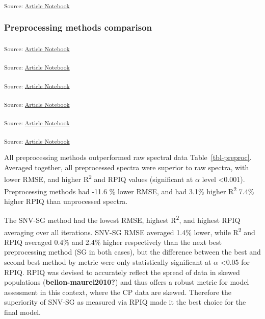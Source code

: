 \documentclass[
]{agujournal2019}
\begin{document}
\textsubscript{Source:
\href{https://rvcrawford.github.io/glowing-system/index.qmd.html}{Article
Notebook}}

\subsubsection{Preprocessing methods
comparison}\label{preprocessing-methods-comparison}

\textsubscript{Source:
\href{https://rvcrawford.github.io/glowing-system/index.qmd.html}{Article
Notebook}}

\textsubscript{Source:
\href{https://rvcrawford.github.io/glowing-system/index.qmd.html}{Article
Notebook}}

\textsubscript{Source:
\href{https://rvcrawford.github.io/glowing-system/index.qmd.html}{Article
Notebook}}

\textsubscript{Source:
\href{https://rvcrawford.github.io/glowing-system/index.qmd.html}{Article
Notebook}}

\textsubscript{Source:
\href{https://rvcrawford.github.io/glowing-system/index.qmd.html}{Article
Notebook}}

\textsubscript{Source:
\href{https://rvcrawford.github.io/glowing-system/index.qmd.html}{Article
Notebook}}

All preprocessing methods outperformed raw spectral data
Table~\ref{tbl-preproc}. Averaged together, all preprocessed spectra
were superior to raw spectra, with lower RMSE, and higher
R\textsuperscript{2} and RPIQ values (significant at \(\alpha\) level
\textless0.001). Preprocessing methods had -11.6 \% lower RMSE, and had
3.1\% higher R\textsuperscript{2} 7.4\% higher RPIQ than unprocessed
spectra.

The SNV-SG method had the lowest RMSE, highest R\textsuperscript{2}, and
highest RPIQ averaging over all iterations. SNV-SG RMSE averaged 1.4\%
lower, while R\textsuperscript{2} and RPIQ averaged 0.4\% and 2.4\%
higher respectively than the next best preprocessing method (SG in both
cases), but the difference between the best and second best method by
metric were only statistically significant at \(\alpha\) \textless0.05
for RPIQ. RPIQ was devised to accurately reflect the spread of data in
skewed populations (\textbf{bellon-maurel2010?}) and thus offers a
robust metric for model assessment in this context, where the CP data
are skewed. Therefore the superiority of SNV-SG as measured via RPIQ
made it the best choice for the final model.
\end{document}
